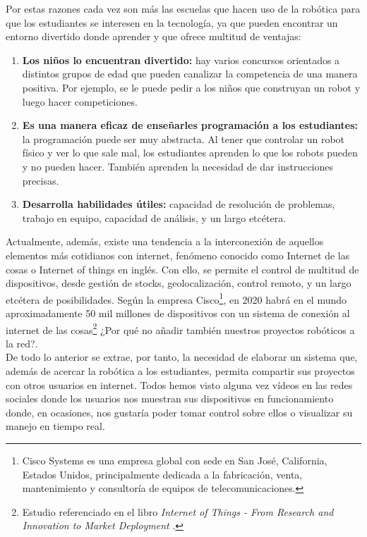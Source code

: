 \documentclass[a4paper,12pt]{article}
\begin{document}
Por estas razones cada vez son más las escuelas que hacen uso de la robótica para que los estudiantes se interesen en la tecnología, ya que pueden encontrar un entorno divertido donde aprender y que ofrece multitud de ventajas:\\

\begin{enumerate}
\item \textbf{Los niños lo encuentran divertido:} hay varios concursos orientados a distintos grupos de edad que pueden canalizar la competencia de una manera positiva. Por ejemplo, se le puede pedir a los niños que construyan un robot y luego hacer competiciones.\\
\item \textbf{Es una manera eficaz de enseñarles programación a los estudiantes:}
 la programación puede ser muy abstracta. Al tener que controlar un robot físico y ver lo que sale mal, los estudiantes aprenden lo que los robots pueden y no pueden hacer. 
También aprenden la necesidad de dar instrucciones precisas.\\
\item \textbf{ Desarrolla habilidades útiles:}
 capacidad de resolución de problemas, trabajo en equipo, capacidad de análisis, y un largo etcétera.
\end{enumerate}


Actualmente, además, existe una tendencia a la interconexión de aquellos elementos más cotidianos con internet, fenómeno conocido como Internet de las cosas o Internet of things en inglés. Con ello,
se permite el control de multitud de dispositivos, desde gestión de stocks, geolocalización, control remoto, y un largo etcétera de posibilidades. Según la empresa Cisco\footnote{Cisco Systems es 
una empresa global con sede en San José, California, Estados Unidos, principalmente dedicada a la fabricación, venta, mantenimiento y consultoría de equipos de telecomunicaciones.}, en 2020 habrá en
el mundo aproximadamente 50 mil millones de dispositivos con un sistema de conexión al internet de las cosas\footnote{ Estudio referenciado en el libro \textit{Internet of Things - From Research and Innovation to Market Deployment} 
\cite{book:internet_things}.} ¿Por qué no añadir también nuestros proyectos robóticos a la red?.\\

De todo lo anterior se extrae, por tanto, la necesidad de elaborar un sistema que, además de acercar la robótica a los estudiantes, permita compartir sus proyectos con otros usuarios en internet. Todos hemos
visto alguna vez vídeos en las redes sociales donde los usuarios nos muestran sus dispositivos en funcionamiento donde, en ocasiones, nos gustaría poder tomar control sobre ellos o visualizar su manejo en tiempo real.\\
\end{document}
